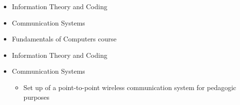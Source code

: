 \documentclass[11pt,a4paper,sans]{moderncv}        %
\begin{document}
\begin{itemize}
\item Information Theory and Coding
\item Communication Systems
\item Fundamentals of Computers course
\end{itemize}
\vspace{10pt}

\begin{itemize}
\item Information Theory and Coding
\item Communication Systems
\begin{itemize}
\item Set up of a point-to-point wireless communication system for pedagogic purposes
\end{itemize}
\end{itemize}
\vspace{10pt}

\end{document}
